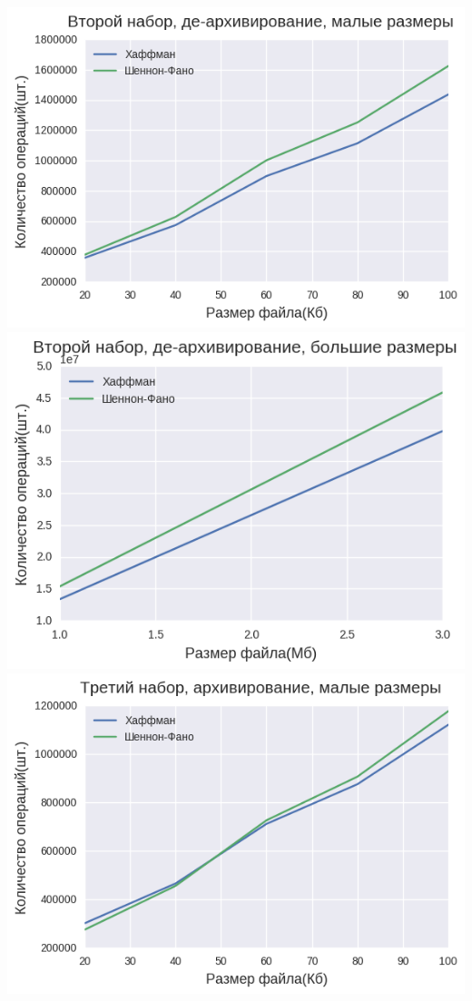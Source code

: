 \documentclass[russian, a4paper, 12pt]{article}
\begin{document}
\begin{center}
\includegraphics[width=0.9\linewidth]{./plots/2/2_2_2_1.png}\\
\includegraphics[width=0.9\linewidth]{./plots/2/2_2_2_2.png}\\
\includegraphics[width=0.9\linewidth]{./plots/2/2_3_1_1.png}\\

\end{center}
\end{document}
